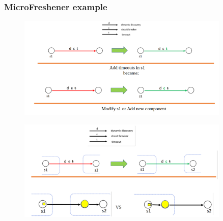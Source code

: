 \documentclass[10pt,a4paper]{report}
\begin{document}
\subsubsection{MicroFreshener example}
\begin{figure}[h]
	\centering
	\includegraphics[width=0.9\textwidth]{image_example_microfreshener}
	\caption{}
	\label{image-microfreshener}
\end{figure}
\begin{figure}[h]
	\centering
	\includegraphics[width=0.9\textwidth]{image-example-microfreshener-2}
	\caption{}
	\label{image-microfreshener2}
\end{figure}
\end{document}
